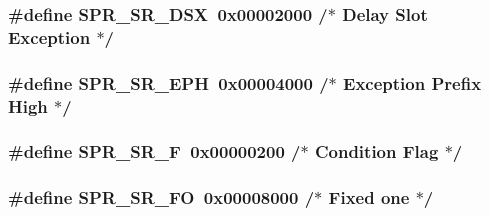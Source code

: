 \hypertarget{spr-defs_8h_a89ea7ae237460e04c77578e914b33e9b}{
\subsubsection[{\-S\-P\-R\-\_\-\-S\-R\-\_\-\-D\-S\-X}]{\setlength{\rightskip}{0pt plus 5cm}\#define {\bf \-S\-P\-R\-\_\-\-S\-R\-\_\-\-D\-S\-X}~0x00002000  /$\ast$ Delay Slot Exception $\ast$/}}\label{spr-defs_8h_a89ea7ae237460e04c77578e914b33e9b}
\hypertarget{spr-defs_8h_a584058371d6491e2fd7c08d4387d0c18}{
\subsubsection[{\-S\-P\-R\-\_\-\-S\-R\-\_\-\-E\-P\-H}]{\setlength{\rightskip}{0pt plus 5cm}\#define {\bf \-S\-P\-R\-\_\-\-S\-R\-\_\-\-E\-P\-H}~0x00004000  /$\ast$ Exception Prefix High $\ast$/}}\label{spr-defs_8h_a584058371d6491e2fd7c08d4387d0c18}
\hypertarget{spr-defs_8h_a2f84d2c4b84979610b5112ddd22a9a5e}{
\subsubsection[{\-S\-P\-R\-\_\-\-S\-R\-\_\-\-F}]{\setlength{\rightskip}{0pt plus 5cm}\#define {\bf \-S\-P\-R\-\_\-\-S\-R\-\_\-\-F}~0x00000200  /$\ast$ Condition Flag $\ast$/}}\label{spr-defs_8h_a2f84d2c4b84979610b5112ddd22a9a5e}
\hypertarget{spr-defs_8h_a2e9db4f88d1fdf94eb02ec5158351790}{
\subsubsection[{\-S\-P\-R\-\_\-\-S\-R\-\_\-\-F\-O}]{\setlength{\rightskip}{0pt plus 5cm}\#define {\bf \-S\-P\-R\-\_\-\-S\-R\-\_\-\-F\-O}~0x00008000  /$\ast$ Fixed one $\ast$/}}\label{spr-defs_8h_a2e9db4f88d1fdf94eb02ec5158351790}
